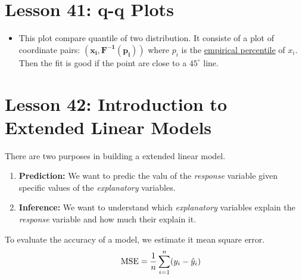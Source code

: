 \documentclass[10pt, french]{article}
\begin{document}
\begin{multicols*}{3}
\section*{Lesson 41: q-q Plots}
\begin{itemize}[align=left,leftmargin=*]
  \item This plot compare quantile of two distribution. It consiste of a plot of coordinate pairs: $\mathbf{\left( x_i, F^{-1}(p_i)\right)}$ where $p_i$ is the {\color{red}\hyperref[Def:empirical percentile]{empirical percentile}} of $x_i$. Then the fit is good if the point are close to a $45^\circ$ line.
\end{itemize}
\begin{center}
\end{center}

\def\SectionColor{blue!80!white}
\section*{Lesson 42: Introduction to Extended Linear Models}
There are two purposes in building a extended linear model.
\begin{enumerate}[align=left,leftmargin=*]
  \item \textbf{Prediction:} We want to predic the valu of the \emph{response} variable given specific values of the \emph{explanatory} variables.
  \item \textbf{Inference:} We want to understand which \emph{explanatory} variables explain the \emph{response} variable and how much their explain it.
\end{enumerate}
To evaluate the accuracy of a model, we estimate it mean square error.
\[\hspace*{0.5cm} \mathrm{MSE} = \frac{1}{n} \sum\limits_{i=1}^n (y_i - \hat{y}_i) \]
\columnbreak

\end{multicols*}
\end{document}
